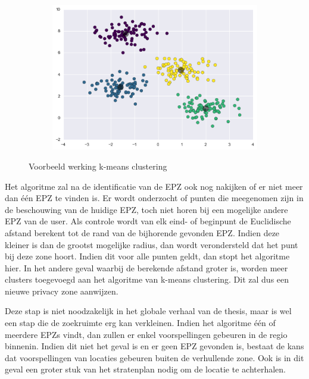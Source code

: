 \begin{figure}[h]
\begin{subfigure}[b]{.33\textwidth}
    \end{subfigure}
    \begin{subfigure}[b]{.33\textwidth}
        \centering
        \includegraphics[width=1\textwidth]{fig/kmeans/3.png}
    \end{subfigure}
    \caption{Voorbeeld werking k-means clustering~\cite{InDepthk59:online}}\label{fig:kmeans}
\end{figure}

Het algoritme zal na de identificatie van de \ac{EPZ} ook nog nakijken of er
niet meer dan één \ac{EPZ} te vinden is. Er wordt onderzocht of punten die
meegenomen zijn in de beschouwing van de huidige \ac{EPZ}, toch niet horen bij
een mogelijke andere \ac{EPZ} van de user. Als controle wordt van elk eind- of
beginpunt de Euclidische afstand berekent tot de rand van de bijhorende
gevonden \ac{EPZ}. Indien deze kleiner is dan de grootst mogelijke radius, dan
wordt verondersteld dat het punt bij deze zone hoort. Indien dit voor alle
punten geldt, dan stopt het algoritme hier. In het andere geval waarbij de
berekende afstand groter is, worden meer clusters toegevoegd aan het algoritme
van k-means clustering. Dit zal dus een nieuwe privacy zone aanwijzen.

Deze stap is niet noodzakelijk in het globale verhaal van de thesis, maar is
wel een stap die de zoekruimte erg kan verkleinen. Indien het algoritme één of
meerdere \acp{EPZ} vindt, dan zullen er enkel voorspellingen gebeuren in de
regio binnenin. Indien dit niet het geval is en er geen \ac{EPZ} gevonden is,
bestaat de kans dat voorspellingen van locaties gebeuren buiten de verhullende
zone. Ook is in dit geval een groter stuk van het stratenplan nodig om de
locatie te achterhalen.


